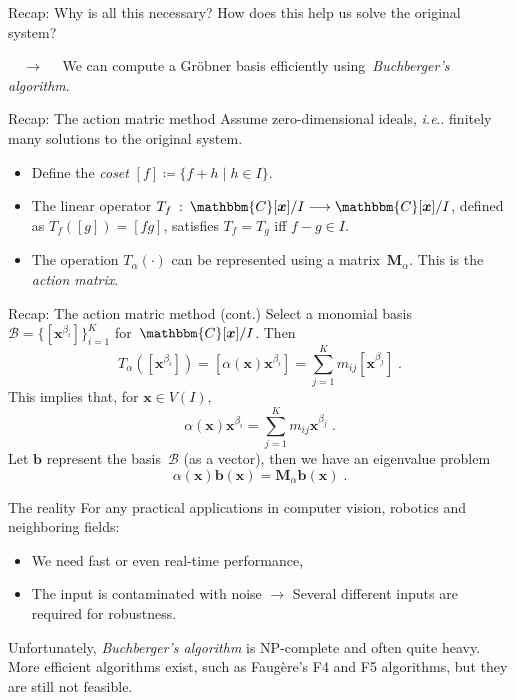 \documentclass[aspectratio=169]{beamer}
\makeatletter
\newcommand{\C}{\ensuremath{\mathbbm{C}}}
\newcommand{\mat}[1]{\bm{#1}}
\DeclareRobustCommand\ie{\emph{i.e}\@ifnextchar.{}{.\@}}
\makeatother
\begin{document}
\begin{frame}{Recap: Why is all this necessary?}
How does this help us solve the original system?

$\quad\longrightarrow\quad$ We can compute a Gröbner basis efficiently using~\emph{Buchberger's algorithm}.
\end{frame}

\begin{frame}{Recap: The action matric method}
Assume zero-dimensional ideals, \ie{} finitely many solutions to the original system.
\begin{itemize}
\item Define the \emph{coset} $[f] \coloneqq \{f+h\;|\;h\in I\}$.
\item The linear operator $T_f\::\:\C[\mat{x}]/I\longrightarrow\C[\mat{x}]/I$, defined as $T_f([g])=[fg]$,
satisfies $T_f=T_g$ iff $f-g\in I$.
\item The operation $T_\alpha(\cdot)$ can be
represented using a matrix~$\mat{M}_\alpha$. This is the \emph{action matrix}.
\end{itemize}
\end{frame}

\begin{frame}{Recap: The action matric method (cont.)}
Select a monomial basis $\mathcal{B}=\{[\mat{x}^{\beta_i}]\}_{i=1}^K$ for~$\C[\mat{x}] / I$.
Then
\begin{equation*}
    T_\alpha([\mat{x}^{\beta_i}]) = [\alpha(\mat{x})\mat{x}^{\beta_i}] = \sum_{j=1}^Km_{ij}[\mat{x}^{\beta_j}]\;.
\end{equation*}
This implies that, for $\mat{x}\in V(I)$,
\begin{equation*}
    \alpha(\mat{x})\mat{x}^{\beta_i}=\sum_{j=1}^Km_{ij}\mat{x}^{\beta_j}\;.
\end{equation*}
Let $\mat{b}$ represent the basis~$\mathcal{B}$ (as a vector), then we have an \alert{eigenvalue problem}
\begin{equation*}
    \alpha(\mat{x})\mat{b}(\mat{x}) = \mat{M}_\alpha\mat{b}(\mat{x})\;.
\end{equation*}
\end{frame}

\begin{frame}{The reality}
For any practical applications in computer vision, robotics and neighboring fields:
\begin{itemize}
\item We need fast or even real-time performance,
\item The input is contaminated with noise $\longrightarrow$ Several different inputs are
required for robustness.
\end{itemize}

Unfortunately, \emph{Buchberger's algorithm} is NP-complete and often quite heavy. More
efficient algorithms exist, such as Faugère's F4 and F5 algorithms, but they are
still not feasible.
\end{frame}
\end{document}
